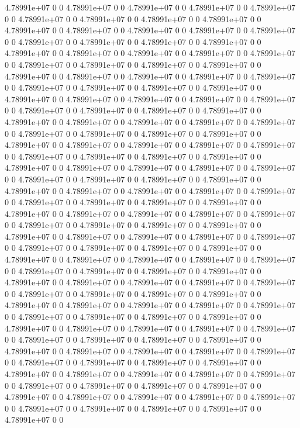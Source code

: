 4.78991e+07 0 0
4.78991e+07 0 0
4.78991e+07 0 0
4.78991e+07 0 0
4.78991e+07 0 0
4.78991e+07 0 0
4.78991e+07 0 0
4.78991e+07 0 0
4.78991e+07 0 0
4.78991e+07 0 0
4.78991e+07 0 0
4.78991e+07 0 0
4.78991e+07 0 0
4.78991e+07 0 0
4.78991e+07 0 0
4.78991e+07 0 0
4.78991e+07 0 0
4.78991e+07 0 0
4.78991e+07 0 0
4.78991e+07 0 0
4.78991e+07 0 0
4.78991e+07 0 0
4.78991e+07 0 0
4.78991e+07 0 0
4.78991e+07 0 0
4.78991e+07 0 0
4.78991e+07 0 0
4.78991e+07 0 0
4.78991e+07 0 0
4.78991e+07 0 0
4.78991e+07 0 0
4.78991e+07 0 0
4.78991e+07 0 0
4.78991e+07 0 0
4.78991e+07 0 0
4.78991e+07 0 0
4.78991e+07 0 0
4.78991e+07 0 0
4.78991e+07 0 0
4.78991e+07 0 0
4.78991e+07 0 0
4.78991e+07 0 0
4.78991e+07 0 0
4.78991e+07 0 0
4.78991e+07 0 0
4.78991e+07 0 0
4.78991e+07 0 0
4.78991e+07 0 0
4.78991e+07 0 0
4.78991e+07 0 0
4.78991e+07 0 0
4.78991e+07 0 0
4.78991e+07 0 0
4.78991e+07 0 0
4.78991e+07 0 0
4.78991e+07 0 0
4.78991e+07 0 0
4.78991e+07 0 0
4.78991e+07 0 0
4.78991e+07 0 0
4.78991e+07 0 0
4.78991e+07 0 0
4.78991e+07 0 0
4.78991e+07 0 0
4.78991e+07 0 0
4.78991e+07 0 0
4.78991e+07 0 0
4.78991e+07 0 0
4.78991e+07 0 0
4.78991e+07 0 0
4.78991e+07 0 0
4.78991e+07 0 0
4.78991e+07 0 0
4.78991e+07 0 0
4.78991e+07 0 0
4.78991e+07 0 0
4.78991e+07 0 0
4.78991e+07 0 0
4.78991e+07 0 0
4.78991e+07 0 0
4.78991e+07 0 0
4.78991e+07 0 0
4.78991e+07 0 0
4.78991e+07 0 0
4.78991e+07 0 0
4.78991e+07 0 0
4.78991e+07 0 0
4.78991e+07 0 0
4.78991e+07 0 0
4.78991e+07 0 0
4.78991e+07 0 0
4.78991e+07 0 0
4.78991e+07 0 0
4.78991e+07 0 0
4.78991e+07 0 0
4.78991e+07 0 0
4.78991e+07 0 0
4.78991e+07 0 0
4.78991e+07 0 0
4.78991e+07 0 0
4.78991e+07 0 0
4.78991e+07 0 0
4.78991e+07 0 0
4.78991e+07 0 0
4.78991e+07 0 0
4.78991e+07 0 0
4.78991e+07 0 0
4.78991e+07 0 0
4.78991e+07 0 0
4.78991e+07 0 0
4.78991e+07 0 0
4.78991e+07 0 0
4.78991e+07 0 0
4.78991e+07 0 0
4.78991e+07 0 0
4.78991e+07 0 0
4.78991e+07 0 0
4.78991e+07 0 0
4.78991e+07 0 0
4.78991e+07 0 0
4.78991e+07 0 0
4.78991e+07 0 0
4.78991e+07 0 0
4.78991e+07 0 0
4.78991e+07 0 0
4.78991e+07 0 0
4.78991e+07 0 0
4.78991e+07 0 0
4.78991e+07 0 0
4.78991e+07 0 0
4.78991e+07 0 0
4.78991e+07 0 0
4.78991e+07 0 0
4.78991e+07 0 0
4.78991e+07 0 0
4.78991e+07 0 0
4.78991e+07 0 0
4.78991e+07 0 0
4.78991e+07 0 0
4.78991e+07 0 0
4.78991e+07 0 0
4.78991e+07 0 0
4.78991e+07 0 0
4.78991e+07 0 0
4.78991e+07 0 0
4.78991e+07 0 0
4.78991e+07 0 0
4.78991e+07 0 0
4.78991e+07 0 0
4.78991e+07 0 0
4.78991e+07 0 0
4.78991e+07 0 0
4.78991e+07 0 0
4.78991e+07 0 0
4.78991e+07 0 0
4.78991e+07 0 0
4.78991e+07 0 0
4.78991e+07 0 0
4.78991e+07 0 0
4.78991e+07 0 0
4.78991e+07 0 0
4.78991e+07 0 0
4.78991e+07 0 0
